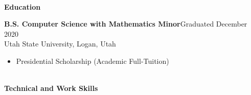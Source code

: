 \documentclass[letterpaper,11pt]{article}
\begin{document}


\begin{Large}\textbf{\\Education}\end{Large}


\textbf{B.S. Computer Science with Mathematics Minor}\hfill Graduated December 2020\\
Utah State University, Logan, Utah%
\begin{itemize}[noitemsep,topsep=0pt]
	\item Presidential Scholarship (Academic Full-Tuition)
\end{itemize}



\begin{Large}\textbf{\\Technical and Work Skills}\end{Large}
\end{document}
